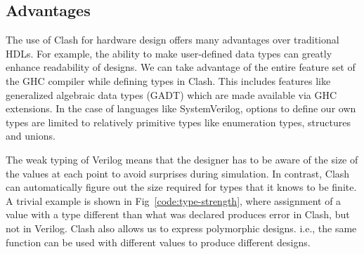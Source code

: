 
\subsection{Advantages}
The use of Clash for hardware design offers many advantages over
traditional \glspl{HDL}.
For example, the ability to make user-defined data types can greatly
enhance readability of designs.
We can take advantage of the entire feature set of the \gls{GHC}
compiler while defining types in Clash.
This includes features like generalized algebraic data types (GADT)
which are made available via
\gls{GHC} extensions.
In the case of languages like SystemVerilog, options to define our own
types are limited to relatively primitive types like enumeration
types, structures and unions.

The weak typing of Verilog means that the designer has to be aware of
the size of the values at each point to avoid surprises during
simulation.
In contrast, Clash can automatically figure out the size required for
types that it knows to be finite.
A trivial example is shown in Fig~\ref{code:type-strength}, where
assignment of a value with a type different than what was declared
produces error in Clash, but not in Verilog.
%
%
Clash also allows us to express polymorphic designs.
i.e., the same function can be used with different values to produce
different designs.

